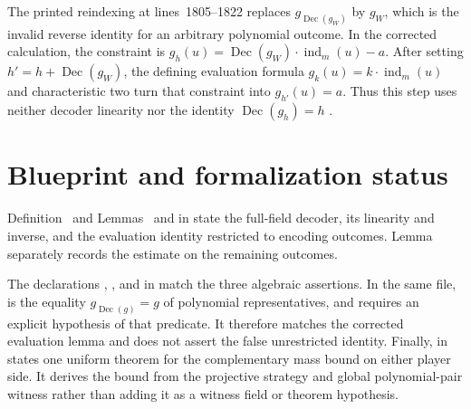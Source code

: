 \documentclass[11pt]{article}
\begin{document}
The printed reindexing at lines~1805--1822 replaces
$g_{\operatorname{Dec}(g_W)}$ by $g_W$, which is the invalid reverse identity
for an arbitrary polynomial outcome.  In the corrected calculation, the
constraint is
$g_h(u)=\operatorname{Dec}(g_W)\mathbin{\cdot}\operatorname{ind}_m(u)-a$.
After setting $h'=h+\operatorname{Dec}(g_W)$, the defining evaluation formula
$g_k(u)=k\mathbin{\cdot}\operatorname{ind}_m(u)$ and characteristic two turn
that constraint into $g_{h'}(u)=a$.  Thus this step uses neither decoder
linearity nor the identity $\operatorname{Dec}(g_h)=h$
\cite[lines~1805--1822]{Ji2020MIPStar}.

\section{Blueprint and formalization status}

Definition~ and
Lemmas~ and
 in
 state the full-field
decoder, its linearity and inverse, and the evaluation identity restricted to
encoding outcomes.  Lemma~
separately records the estimate on the remaining outcomes.

The declarations , , and
 in
 match the three algebraic assertions.
In the same file,  is the equality
$g_{\operatorname{Dec}(g)}=g$ of polynomial representatives, and
 requires an explicit hypothesis
of that predicate.  It therefore matches the corrected evaluation lemma and
does not assert the false unrestricted identity.  Finally,
 in
 states one uniform theorem for
the complementary mass bound on either player side.  It derives the bound from
the projective strategy and global polynomial-pair witness rather than adding it
as a witness field or theorem hypothesis.
\end{document}
